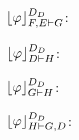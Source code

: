 \begin{example}
\begin{multicols}{3}
{$\projectionDDefinitional{\varphi}{F, E \seq G}$:
\begin{prooftree}
		 
	 
\end{prooftree}
}
\end{multicols}


\begin{multicols}{3}{
$\projectionDDefinitional{\varphi}{D \seq H}$:
\begin{prooftree}
 
 
 
\end{prooftree}

$\projectionDDefinitional{\varphi}{G \seq H}$:
\begin{prooftree}
 
 
 
\end{prooftree}

$\projectionDDefinitional{\varphi}{H \seq G, D}$:
\begin{prooftree}
		 
	 
\end{prooftree}
}
\end{multicols}

\end{example}



